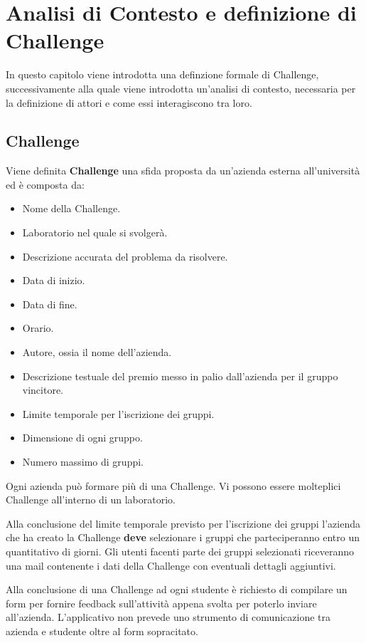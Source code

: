 \chapter{Analisi di Contesto e definizione di Challenge}

In questo capitolo viene introdotta una definzione formale di Challenge, successivamente alla quale viene introdotta un'analisi di contesto, necessaria per la definizione di attori e come essi interagiscono tra loro.

\section{Challenge}
\label{sec:challenge}
Viene definita \textbf{Challenge} una sfida proposta da un'azienda esterna all'università ed è composta da:

\begin{itemize}
    \item Nome della Challenge.
    \item Laboratorio nel quale si svolgerà.
    \item Descrizione accurata del problema da risolvere.
    \item Data di inizio. 
    \item Data di fine.
    \item Orario.
    \item Autore, ossia il nome dell'azienda.
    \item Descrizione testuale del premio messo in palio dall'azienda per il gruppo vincitore.
    \item Limite temporale per l'iscrizione dei gruppi.
    \item Dimensione di ogni gruppo. 
    \item Numero massimo di gruppi.
\end{itemize}

Ogni azienda può formare più di una Challenge. Vi possono essere molteplici Challenge all'interno di un laboratorio.

Alla conclusione del limite temporale previsto per l'iscrizione dei gruppi l'azienda che ha creato la Challenge \textbf{deve} selezionare i gruppi che parteciperanno entro un quantitativo di giorni. Gli utenti facenti parte dei gruppi selezionati riceveranno una mail contenente i dati della Challenge con eventuali dettagli aggiuntivi.

Alla conclusione di una Challenge ad ogni studente è richiesto di compilare un form per fornire feedback sull'attività appena svolta per poterlo inviare all'azienda.
L'applicativo non prevede uno strumento di comunicazione tra azienda e studente oltre al form sopracitato.

